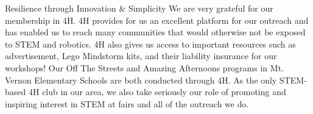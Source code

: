 \begin{TeamStory}{Resilience through Innovation \& Simplicity}
We are very grateful for our membership in 4H. 4H provides for us an
excellent platform for our outreach and has enabled us to reach many
communities that would otherwise not be exposed to STEM and
robotics. 4H also gives us access to important resources such as
advertisement, Lego Mindstorm kits, and their liability insurance for
our workshops! Our Off The Streets and Amazing Afternoons programs in
Mt. Vernon Elementary Schools are both conducted through 4H. As the
only STEM-based 4H club in our area, we also take seriously our role
of promoting and inspiring interest in STEM at fairs and all of the
outreach we do.

\end{TeamStory}
